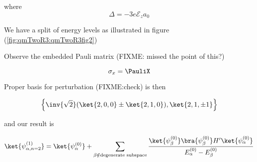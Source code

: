 {where
\begin{equation}\label{eqn:qmTwoR3:590}
\Delta = -3 e \mathcal{E}_z a_0
\end{equation}

We have a split of energy levels as illustrated in figure (\ref{fig:qmTwoR3:qmTwoR3fig2})


Observe the embedded Pauli matrix (FIXME: missed the point of this?)

\begin{equation}\label{eqn:qmTwoR3:330}
\sigma_x = \PauliX
\end{equation}

Proper basis for perturbation (FIXME:check) is then

\begin{equation}\label{eqn:qmTwoR3:350}
\left\{
\inv{\sqrt{2}}
( 
\ket{2,0,0} 
\pm 
\ket{2,1,0} 
), 
\ket{2, 1, \pm 1}
\right\}
\end{equation}

and our result is

\begin{equation}\label{eqn:qmTwoR3:370}
\ket{\psi_{\alpha, n=2}^{(1)}} = 
\ket{\psi_{\alpha}^{(0)}} 
+\sum_{\beta \notin \text{degenerate subspace}} \frac{ 
\ket{\psi_\beta^{(0)}} \bra{\psi_\beta^{(0)}} H' \ket{\psi_\alpha^{(0)}} 
}{
E_\alpha^{(0)} 
-E_\beta^{(0)} 
}
\end{equation}
}

